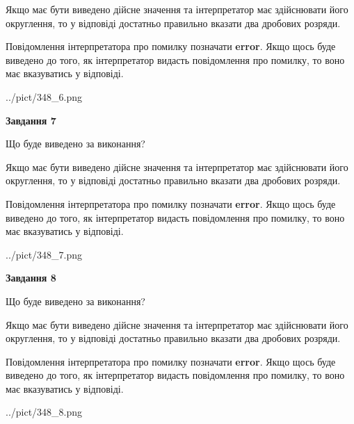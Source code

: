 \documentclass[12pt, ukrainian]{article}
\begin{document}
{\begin {Large}
Якщо має бути виведено дійсне значення та інтерпретатор має здійснювати його округлення, 
то у відповіді достатньо правильно вказати два дробових розряди.

Повідомлення інтерпретатора про помилку позначати \textbf{error}.
Якщо щось буде виведено до того, як інтерпретатор видасть повідомлення про помилку, 
то воно має вказуватись у відповіді. \par

\begin{center}
	{../pict/348_6.png}
\end{center}
\newpage

{\begin {center}\textbf{Завдання 7}\end {center}}\par
Що буде виведено за виконання? \par

Якщо має бути виведено дійсне значення та інтерпретатор має здійснювати його округлення, 
то у відповіді достатньо правильно вказати два дробових розряди.

Повідомлення інтерпретатора про помилку позначати \textbf{error}.
Якщо щось буде виведено до того, як інтерпретатор видасть повідомлення про помилку, 
то воно має вказуватись у відповіді. \par

\begin{center}
	{../pict/348_7.png}
\end{center}
\newpage

{\begin {center}\textbf{Завдання 8}\end {center}}\par
Що буде виведено за виконання? \par

Якщо має бути виведено дійсне значення та інтерпретатор має здійснювати його округлення, 
то у відповіді достатньо правильно вказати два дробових розряди.

Повідомлення інтерпретатора про помилку позначати \textbf{error}.
Якщо щось буде виведено до того, як інтерпретатор видасть повідомлення про помилку, 
то воно має вказуватись у відповіді. \par

\begin{center}
	{../pict/348_8.png}
\end{center}
\newpage


\end{Large}}
\end{document}
